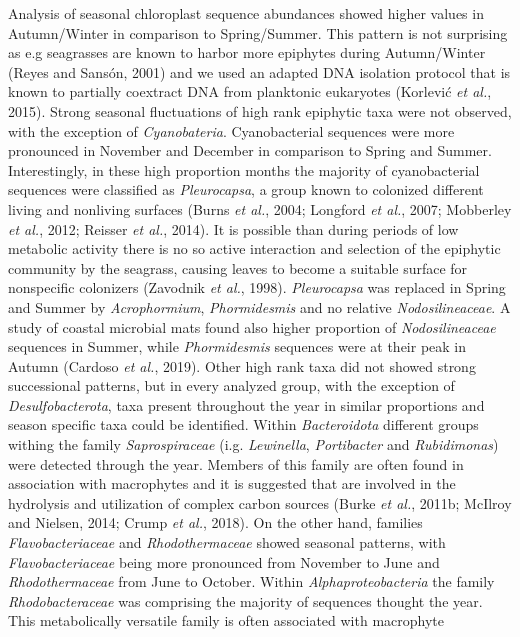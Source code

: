 \documentclass[12pt,]{article}
\begin{document}
Analysis of seasonal chloroplast sequence abundances showed higher
values in Autumn/Winter in comparison to Spring/Summer. This pattern is
not surprising as e.g seagrasses are known to harbor more epiphytes
during Autumn/Winter (Reyes and Sansón, 2001) and we used an adapted DNA
isolation protocol that is known to partially coextract DNA from
planktonic eukaryotes (Korlević \emph{et al.}, 2015). Strong seasonal
fluctuations of high rank epiphytic taxa were not observed, with the
exception of \emph{Cyanobateria}. Cyanobacterial sequences were more
pronounced in November and December in comparison to Spring and Summer.
Interestingly, in these high proportion months the majority of
cyanobacterial sequences were classified as \emph{Pleurocapsa}, a group
known to colonized different living and nonliving surfaces (Burns
\emph{et al.}, 2004; Longford \emph{et al.}, 2007; Mobberley \emph{et
al.}, 2012; Reisser \emph{et al.}, 2014). It is possible than during
periods of low metabolic activity there is no so active interaction and
selection of the epiphytic community by the seagrass, causing leaves to
become a suitable surface for nonspecific colonizers (Zavodnik \emph{et
al.}, 1998). \emph{Pleurocapsa} was replaced in Spring and Summer by
\emph{Acrophormium}, \emph{Phormidesmis} and no relative
\emph{Nodosilineaceae}. A study of coastal microbial mats found also
higher proportion of \emph{Nodosilineaceae} sequences in Summer, while
\emph{Phormidesmis} sequences were at their peak in Autumn (Cardoso
\emph{et al.}, 2019). Other high rank taxa did not showed strong
successional patterns, but in every analyzed group, with the exception
of \emph{Desulfobacterota}, taxa present throughout the year in similar
proportions and season specific taxa could be identified. Within
\emph{Bacteroidota} different groups withing the family
\emph{Saprospiraceae} (i.g. \emph{Lewinella}, \emph{Portibacter} and
\emph{Rubidimonas}) were detected through the year. Members of this
family are often found in association with macrophytes and it is
suggested that are involved in the hydrolysis and utilization of complex
carbon sources (Burke \emph{et al.}, 2011b; McIlroy and Nielsen, 2014;
Crump \emph{et al.}, 2018). On the other hand, families
\emph{Flavobacteriaceae} and \emph{Rhodothermaceae} showed seasonal
patterns, with \emph{Flavobacteriaceae} being more pronounced from
November to June and \emph{Rhodothermaceae} from June to October. Within
\emph{Alphaproteobacteria} the family \emph{Rhodobacteraceae} was
comprising the majority of sequences thought the year. This
metabolically versatile family is often associated with macrophyte
\end{document}
